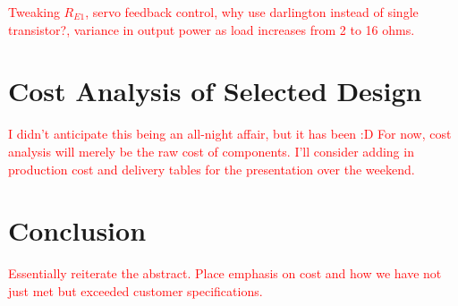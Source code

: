 \documentclass[journal]{IEEEtran}
\begin{document}
\textcolor{red}{Tweaking $R_{E1}$, servo feedback control, why use darlington instead of single transistor?, variance in output power as load increases from 2 to 16 ohms.}

\section{Cost Analysis of Selected Design}

\textcolor{red}{I didn't anticipate this being an all-night affair, but it has been :D For now, cost analysis will merely be the raw cost of components. I'll consider adding in production cost and delivery tables for the presentation over the weekend.}

\section{Conclusion}

\textcolor{red}{Essentially reiterate the abstract. Place emphasis on cost and how we have not just met but exceeded customer specifications.}

\end{document}
